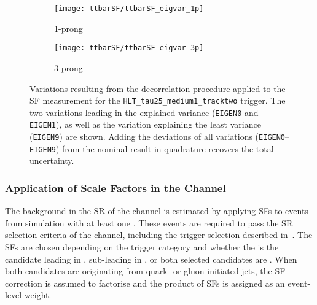 \begin{figure}[htbp]
  \centering

  \begin{subfigure}[t]{.495\textwidth}
    \texttt{[image: ttbarSF/ttbarSF\_eigvar\_1p]}
    \caption{1-prong \tauhadvis}
    \label{fig:ttbarSF_eigenvariations_1p}
  \end{subfigure}\hfill%
  \begin{subfigure}[t]{.495\textwidth}
    \texttt{[image: ttbarSF/ttbarSF\_eigvar\_3p]}
    \caption{3-prong \tauhadvis}
    \label{fig:ttbarSF_eigenvariations_3p}
  \end{subfigure}

  \caption{Variations resulting from the decorrelation procedure applied to the
    SF measurement for the \texttt{HLT\_tau25\_medium1\_tracktwo} trigger. The
    two variations leading in the explained variance (\texttt{EIGEN0} and
    \texttt{EIGEN1}), as well as the variation explaining the least variance
    (\texttt{EIGEN9}) are shown. Adding the deviations of all variations
    (\texttt{EIGEN0}--\texttt{EIGEN9}) from the nominal result in quadrature
    recovers the total uncertainty.}%
  \label{fig:ttbarSF_eigenvariations}
\end{figure}


\subsubsection{Application of \Faketauhadvis Scale Factors in the \hadhad
  Channel}

The \ttbarFakes background in the SR of the \hadhad channel is estimated by
applying \faketauhadvis SFs to \ttbar events from simulation with at least one
\faketauhadvis. These events are required to pass the SR selection criteria of
the \hadhad channel, including the trigger selection described
in~. The SFs are chosen depending on the trigger category and
whether the \faketauhadvis is the \tauhadvis candidate leading in \pT,
sub-leading in \pT, or both selected candidates are \faketauhadvis. When both
\tauhadvis candidates are originating from quark- or gluon-initiated jets, the
SF correction is assumed to factorise and the product of SFs is assigned as an
event-level weight.

